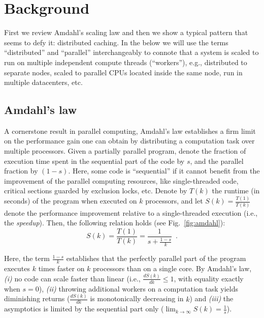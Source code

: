 \section{Background}\label{sec:background}

First we review Amdahl's scaling law and then we show a typical pattern that seems to defy it: distributed caching. In the below we will use the terms ``distributed'' and ``parallel'' interchangeably to connote that a system is scaled to run on multiple independent compute threads (``workers''), e.g., distributed to separate nodes, scaled to parallel CPUs located inside the same node, run in multiple datacenters, etc.

\subsection{Amdahl's law}
\label{sec:amdahl-law}

A cornerstone result in parallel computing, Amdahl's law \cite{10.1145/1465482.1465560} establishes a firm limit on the performance gain one can obtain by distributing a computation task over multiple processors. Given a partially parallel program, denote the fraction of execution time spent %
in the sequential part of the code by $s$, and the parallel fraction by $(1-s)$. Here, some code is ``sequential'' if it cannot benefit from the improvement of the parallel computing resources, like single-threaded code, critical sections guarded by exclusion locks, etc. Denote by $T(k)$ the runtime (in seconds) of the program when executed on $k$ processors, and let $S(k)=\frac{T(1)}{T(k)}$ denote the performance improvement relative to a single-threaded execution (i.e., the \emph{speedup}). Then, the following relation holds (see Fig.~\ref{fig:amdahl}):
\begin{equation}\label{eq:amdahl}
S(k) = \frac{T(1)}{T(k)} = \frac{1}{s + \frac{1-s}{k}} \enspace .
\end{equation}

Here, the term $\frac{1-s}{k}$ establishes that the perfectly parallel part of the program executes $k$ times faster on $k$ processors than on a single core. By Amdahl's law, \emph{(i)} no code can scale faster than linear (i.e., $\frac{d S(k)}{d k} \le 1$, with equality exactly when $s=0$), \emph{(ii)} throwing additional workers on a computation task yields diminishing returns ($\frac{d S(k)}{d k}$ is monotonically decreasing in $k$) and \emph{(iii)} the asymptotics is limited by the sequential part only ($\lim_{k\to \infty}S(k) = \frac1{s}$). 

